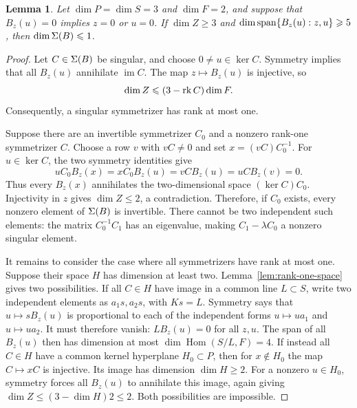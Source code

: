 \documentclass[11pt,a4paper]{article}
\numberwithin{equation}{section}
\theoremstyle{plain}
\newtheorem{lemma}[theorem]{Lemma}
\theoremstyle{definition}
\DeclareMathOperator{\im}{im}\DeclareMathOperator{\supp}{supp}
\DeclareMathOperator{\Hom}{Hom}\DeclareMathOperator{\diag}{diag}
\newcommand{\leqs}{\leqslant}\newcommand{\geqs}{\geqslant}
\begin{document}
\begin{lemma}\label{lem:sym-small}
Let $\dim P=\dim S=3$ and $\dim F=2$, and suppose that $B_z(u)=0$
implies $z=0$ or $u=0$. If $\dim Z\geqs3$ and
$\dim\Span\{B_z(u):z,u\}\geqs5$, then $\dim\Sig(B)\leqs1$.
\end{lemma}
\begin{proof}
Let $C\in\Sigma(B)$ be singular, and choose $0\ne u\in\ker C$.
Symmetry implies that all $B_z(u)$ annihilate $\im C$.
The map $z\mapsto B_z(u)$ is injective, so
\begin{equation}\label{eq:sym-capacity}
 \dim Z\leqs(3-\rk C)\dim F.
\end{equation}
Consequently, a singular symmetrizer has rank at most one.

Suppose there are an invertible symmetrizer $C_0$ and a nonzero
rank-one symmetrizer $C$. Choose a row $v$ with $vC\ne0$ and set
$x=(vC)C_0^{-1}$. For $u\in\ker C$, the two symmetry identities give
\[
 uC_0B_z(x)=xC_0B_z(u)=vCB_z(u)=uCB_z(v)=0.
\]
Thus every $B_z(x)$ annihilates the two-dimensional space $(\ker C)C_0$.
Injectivity in $z$ gives $\dim Z\leqs2$, a contradiction.
Therefore, if $C_0$ exists, every nonzero element of $\Sigma(B)$ is
invertible. There cannot be two independent such elements: the matrix
$C_0^{-1}C_1$ has an eigenvalue, making $C_1-\lambda C_0$ a nonzero
singular element.

It remains to consider the case where all symmetrizers have rank at
most one. Suppose their space $H$ has dimension at least two.
Lemma~\ref{lem:rank-one-space} gives two possibilities.
If all $C\in H$ have image in a common line $L\subset S$, write two
independent elements as $a_1s,a_2s$, with $Ks=L$.
Symmetry says that $u\mapsto sB_z(u)$ is proportional to each of the
independent forms $u\mapsto ua_1$ and $u\mapsto ua_2$.
It must therefore vanish: $LB_z(u)=0$ for all $z,u$.
The span of all $B_z(u)$ then has dimension at most
$\dim\Hom(S/L,F)=4$.
If instead all $C\in H$ have a common kernel hyperplane $H_0\subset P$,
then for $x\notin H_0$ the map $C\mapsto xC$ is injective.
Its image has dimension $\dim H\geqs2$. For a nonzero $u\in H_0$,
symmetry forces all $B_z(u)$ to annihilate this image, again giving
$\dim Z\leqs(3-\dim H)2\leqs2$. Both possibilities are impossible.
\end{proof}
\end{document}
